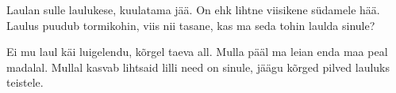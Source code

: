 Laulan sulle laulukese, kuulatama j\"a\"a.
On ehk lihtne viisikene s\"udamele h\"a\"a.
Laulus puudub tormikohin,
viis nii tasane,
kas ma seda tohin laulda sinule?

Ei mu laul k\"ai luigelendu, k\~orgel taeva all.
Mulla p\"a\"al ma leian enda maa peal madalal.
Mullal kasvab lihtsaid lilli
need on sinule,
j\"a\"agu k\~orged pilved lauluks teistele.
